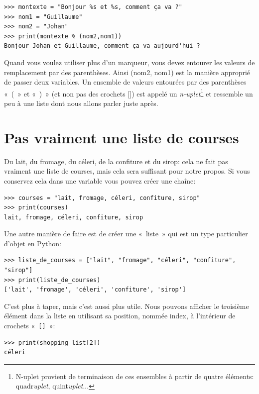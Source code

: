 \begin{Verbatim}[frame=single,rulecolor=\color{mbleu}, label=à taper]
>>> montexte = "Bonjour %s et %s, comment ça va ?"
>>> nom1 = "Guillaume"
>>> nom2 = "Johan"
>>> print(montexte % (nom2,nom1))
Bonjour Johan et Guillaume, comment ça va aujourd'hui ?
\end{Verbatim}

Quand vous voulez utiliser plus d'un marqueur, vous devez entourer les valeurs de remplacement par des parenthèses. Ainsi (nom2, nom1) est la manière approprié de passer deux variables. Un ensemble de valeurs entourées par des parenthèses «~(~» et «~)~» (et non pas des crochets []) est appelé un \emph{n-uplet}\footnote{N-uplet provient de terminaison de ces ensembles à partir de quatre éléments: quadr\emph{uplet}, quint\emph{uplet}...} et ressemble un peu à une liste dont nous allons parler juste après.

\section{Pas vraiment une liste de courses}
Du lait, du fromage, du céleri, de la confiture et du sirop: cela ne fait pas vraiment une liste de courses, mais cela sera suffisant pour notre propos. Si vous conservez cela dans une variable vous pouvez créer une chaîne:

\begin{Verbatim}[frame=single,rulecolor=\color{mbleu}, label=à taper]
>>> courses = "lait, fromage, céleri, confiture, sirop"
>>> print(courses)
lait, fromage, céleri, confiture, sirop
\end{Verbatim}

Une autre manière de faire est de créer une «~liste~» qui est un type particulier d'objet en Python:
\begin{small}
\begin{Verbatim}[frame=single,rulecolor=\color{mbleu}, label=à taper]
>>> liste_de_courses = ["lait", "fromage", "céleri", "confiture", "sirop"]
>>> print(liste_de_courses)
['lait', 'fromage', 'céleri', 'confiture', 'sirop']
\end{Verbatim}
\end{small}
C'est plus à taper, mais c'est aussi plus utile. 
Nous pouvons afficher le troisième élément dans la liste en utilisant sa position, nommée index, à l'intérieur de crochets «~\texttt{[]}~»:

\begin{Verbatim}[frame=single,rulecolor=\color{mbleu}, label=à taper]
>>> print(shopping_list[2])
céleri
\end{Verbatim}

